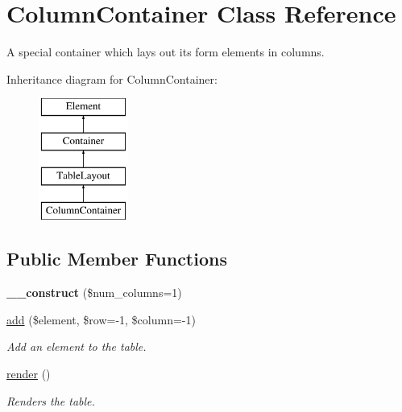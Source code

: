 \hypertarget{class_column_container}{
\section{ColumnContainer Class Reference}
\label{class_column_container}
}


A special container which lays out its form elements in columns.  


Inheritance diagram for ColumnContainer:\begin{figure}[H]
\begin{center}
\leavevmode
\includegraphics[height=4.000000cm]{class_column_container}
\end{center}
\end{figure}
\subsection*{Public Member Functions}
\begin{DoxyCompactItemize}
\item 
\hypertarget{class_column_container_a8b6c7c5d8fe133fb22742a82e5bffbb3}{
{\bfseries \_\-\_\-construct} (\$num\_\-columns=1)}
\label{class_column_container_a8b6c7c5d8fe133fb22742a82e5bffbb3}

\item 
\hyperlink{class_column_container_a007bcdbf4d4cb4baf777728bbed600ab}{add} (\$element, \$row=-\/1, \$column=-\/1)
\begin{DoxyCompactList}\small\item\em Add an element to the table. \item\end{DoxyCompactList}\item 
\hypertarget{class_column_container_a02cb2f5dd2685beb4a10f88f27d498f9}{
\hyperlink{class_column_container_a02cb2f5dd2685beb4a10f88f27d498f9}{render} ()}
\label{class_column_container_a02cb2f5dd2685beb4a10f88f27d498f9}

\begin{DoxyCompactList}\small\item\em Renders the table. \item\end{DoxyCompactList}\end{DoxyCompactItemize}
